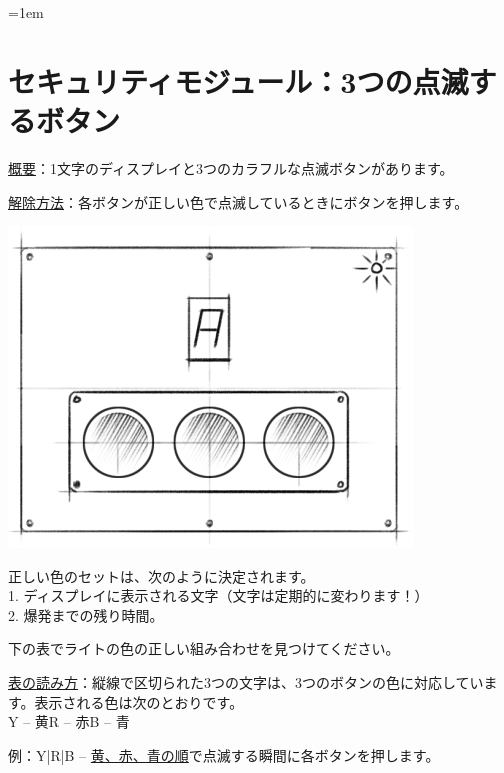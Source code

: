 \begin{minipage}{0.63\textwidth}
\parskip=1em
\section*{セキュリティモジュール：3つの点滅するボタン}

\uline{概要}：1文字のディスプレイと3つのカラフルな点滅ボタンがあります。

\uline{解除方法}：各ボタンが正しい色で点滅しているときにボタンを押します。
\end{minipage}%
\hfill%
\begin{minipage}{0.33\textwidth}
    \includegraphics[width=\textwidth]{images/4.png}
    \vspace*{\fill}
\end{minipage}

正しい色のセットは、次のように決定されます。\\
1. ディスプレイに表示される文字（文字は定期的に変わります！）\\
2. 爆発までの残り時間。

下の表でライトの色の正しい組み合わせを見つけてください。

\uline{表の読み方}：縦線で区切られた3つの文字は{、}3つのボタンの色に対応しています。表示される色は次のとおりです。\\
\hspace*{6em} Y -- 黄\hspace*{3em}R -- 赤\hspace*{3em}B -- 青

例：Y|R|B -- \uline{黄、赤、青の順}で点滅する瞬間に各ボタンを押します。

